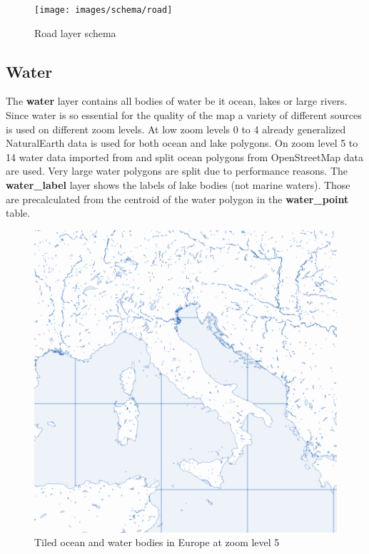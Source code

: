 \begin{figure}[H]
  \centering
  \texttt{[image: images/schema/road]}
  \caption{Road layer schema}
\end{figure}

\subsection{Water}


\noindent\begin{minipage}[t]{0.48\linewidth}
    \vspace{0pt}
    The \textbf{water} layer contains all bodies of water be it ocean, lakes or large rivers.
    Since water is so essential for the quality of the map a variety of different sources is used on different zoom levels. At low zoom levels 0 to 4 already generalized NaturalEarth data is used for both ocean and lake polygons. On zoom level 5 to 14 water data imported from \osm{} and split ocean polygons from OpenStreetMap data are used. Very large water polygons are split due to performance reasons.
    The \textbf{water\_label} layer shows the labels of lake bodies (not marine waters). Those are precalculated from the centroid of the water polygon in the \textbf{water\_point} table.
\end{minipage}
\hfill
\begin{minipage}[t]{0.48\linewidth}
    \vspace{-20pt}
    \begin{figure}[H]
      \includegraphics[width=1\textwidth]{images/schema/water_example}
      \caption{Tiled ocean and water bodies in Europe at zoom level 5}
    \end{figure}
\end{minipage}

